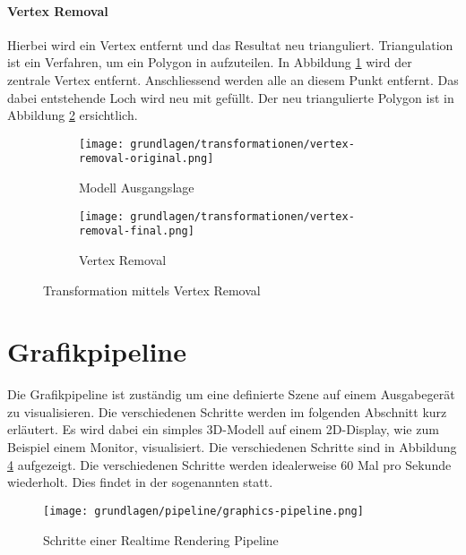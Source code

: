 \paragraph{Vertex Removal}
Hierbei wird ein Vertex entfernt und das Resultat neu trianguliert. Triangulation ist ein Verfahren, um ein Polygon in  aufzuteilen.
In Abbildung \ref{fig:transformationVertexRemovalOriginal} wird der zentrale Vertex entfernt. Anschliessend werden alle  an diesem Punkt entfernt. Das dabei entstehende Loch wird neu mit  gefüllt. Der neu triangulierte Polygon ist in Abbildung \ref{fig:transformationVertexRemovalFinal} ersichtlich.

\begin{figure}[H]
  \centering
  \begin{subfigure}{.5\textwidth}
    \centering
    \texttt{[image: grundlagen/transformationen/vertex-removal-original.png]}
    \caption{Modell Ausgangslage}
    \label{fig:transformationVertexRemovalOriginal}
  \end{subfigure}%
  \begin{subfigure}{.5\textwidth}
    \centering
    \texttt{[image: grundlagen/transformationen/vertex-removal-final.png]}
    \caption{Vertex Removal}
    \label{fig:transformationVertexRemovalFinal}
  \end{subfigure}
  \caption{Transformation mittels Vertex Removal}
  \label{fig:transformationVertexRemoval}
\end{figure}

\section{Grafikpipeline}
Die Grafikpipeline ist zuständig um eine definierte Szene auf einem Ausgabegerät zu visualisieren. Die verschiedenen Schritte werden im folgenden Abschnitt kurz erläutert. Es wird dabei ein simples 3D-Modell auf einem 2D-Display, wie zum Beispiel einem Monitor, visualisiert. Die verschiedenen Schritte sind in Abbildung \ref{fig:renderingPipelineOverview} aufgezeigt. Die verschiedenen Schritte werden idealerweise 60 Mal pro Sekunde wiederholt. Dies findet in der sogenannten  statt.

\begin{figure}[H]
  \centering
  \texttt{[image: grundlagen/pipeline/graphics-pipeline.png]}
  \caption{Schritte einer Realtime Rendering Pipeline}
  \label{fig:renderingPipelineOverview}
\end{figure}

